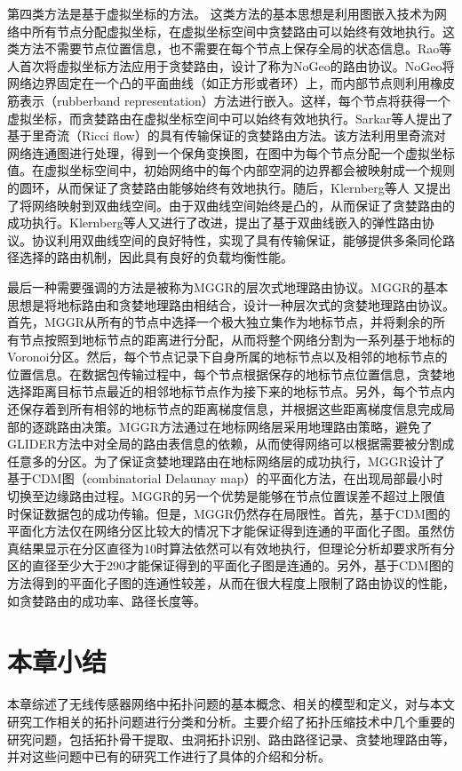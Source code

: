 第四类方法是基于虚拟坐标的方法。 这类方法的基本思想是利用图嵌入技术为网络中所有节点分配虚拟坐标，在虚拟坐标空间中贪婪路由可以始终有效地执行。这类方法不需要节点位置信息，也不需要在每个节点上保存全局的状态信息。Rao等人首次将虚拟坐标方法应用于贪婪路由，设计了称为NoGeo的路由协议。NoGeo将网络边界固定在一个凸的平面曲线（如正方形或者环）上，而内部节点则利用橡皮筋表示（rubberband representation）方法进行嵌入。这样，每个节点将获得一个虚拟坐标，而贪婪路由在虚拟坐标空间中可以始终有效地执行。Sarkar等人提出了基于里奇流（Ricci flow）的具有传输保证的贪婪路由方法。该方法利用里奇流对网络连通图进行处理，得到一个保角变换图，在图中为每个节点分配一个虚拟坐标值。在虚拟坐标空间中，初始网络中的每个内部空洞的边界都会被映射成一个规则的圆环，从而保证了贪婪路由能够始终有效地执行。随后，Klernberg等人 又提出了将网络映射到双曲线空间。由于双曲线空间始终是凸的，从而保证了贪婪路由的成功执行。Klernberg等人又进行了改进，提出了基于双曲线嵌入的弹性路由协议。协议利用双曲线空间的良好特性，实现了具有传输保证，能够提供多条同伦路径选择的路由机制，因此具有良好的负载均衡性能。

最后一种需要强调的方法是被称为MGGR的层次式地理路由协议。MGGR的基本思想是将地标路由和贪婪地理路由相结合，设计一种层次式的贪婪地理路由协议。首先，MGGR从所有的节点中选择一个极大独立集作为地标节点，并将剩余的所有节点按照到地标节点的距离进行分配，从而将整个网络分割为一系列基于地标的Voronoi分区。然后，每个节点记录下自身所属的地标节点以及相邻的地标节点的位置信息。在数据包传输过程中，每个节点根据保存的地标节点位置信息，贪婪地选择距离目标节点最近的相邻地标节点作为接下来的地标节点。另外，每个节点内还保存着到所有相邻的地标节点的距离梯度信息，并根据这些距离梯度信息完成局部的逐跳路由决策。MGGR方法通过在地标网络层采用地理路由策略，避免了GLIDER方法中对全局的路由表信息的依赖，从而使得网络可以根据需要被分割成任意多的分区。为了保证贪婪地理路由在地标网络层的成功执行，MGGR设计了基于CDM图（combinatorial Delaunay map）的平面化方法，在出现局部最小时切换至边缘路由过程。MGGR的另一个优势是能够在节点位置误差不超过上限值时保证数据包的成功传输。但是，MGGR仍然存在局限性。首先，基于CDM图的平面化方法仅在网络分区比较大的情况下才能保证得到连通的平面化子图。虽然仿真结果显示在分区直径为10时算法依然可以有效地执行，但理论分析却要求所有分区的直径至少大于290才能保证得到的平面化子图是连通的。另外，基于CDM图的方法得到的平面化子图的连通性较差，从而在很大程度上限制了路由协议的性能，如贪婪路由的成功率、路径长度等。
\section{本章小结}
本章综述了无线传感器网络中拓扑问题的基本概念、相关的模型和定义，对与本文研究工作相关的拓扑问题进行分类和分析。主要介绍了拓扑压缩技术中几个重要的研究问题，包括拓扑骨干提取、虫洞拓扑识别、路由路径记录、贪婪地理路由等，并对这些问题中已有的研究工作进行了具体的介绍和分析。
